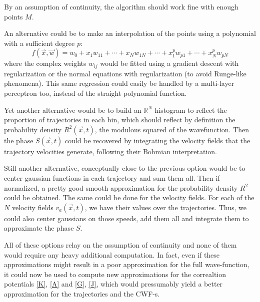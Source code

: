 \documentclass[11pt, a4paper]{article} %
\newcommand{\R}{\mathbb{R}} %
\begin{document}
By an assumption of continuity, the algorithm should work fine with enough points $M$.

An alternative could be to make an interpolation of the points using a polynomial with a sufficient degree $p$: $$f(\vec{x},\vec{w})=w_0+x_1w_{11}+\cdots+x_Nw_{1N}+\cdots+x_1^pw_{p1}+\cdots+x_N^pw_{pN}$$
where the complex weights $w_{ij}$ would be fitted using a gradient descent with regularization or the normal equations with regularization (to avoid Runge-like phenomena). This same regression could easily be handled by a multi-layer perceptron too, instead of the straight polynomial function.


Yet another alternative would be to build an $\R^N$ histogram to reflect the proportion of trajectories in each bin, which should reflect by definition the probability density $R^2(\vec{x},t)$, the modulous squared of the wavefunction. Then the phase $S(\vec{x},t)$ could be recovered by integrating the velocity fields that the trajectory velocities generate, following their Bohmian interpretation.


Still another alternative, conceptually close to the previous option would be to center gaussian functions in each trajectory and sum them all. Then if normalized, a pretty good smooth approximation for the probability density $R^2$ could be obtained. The same could be done for the velocity fields. For each of the $N$ velocity fields $v_a(\vec{x},t)$, we have their values over the trajectories. Thus, we could also center gaussians on those speeds, add them all and integrate them to approximate the phase $S$.

All of these options relay on the assumption of continuity and none of them would require any heavy additional computation. In fact, even if these approximations might result in a poor approximation for the full wave-function, it could now be used to compute new approximations for the correaltion potentials \ref{K}, \ref{A} and \ref{G}, \ref{J}, which would pressumably yield a better approximation for the trajectories and the CWF-s. 
\end{document}
